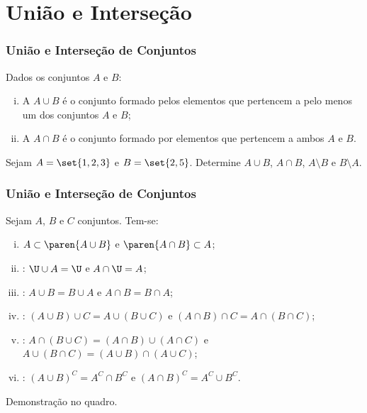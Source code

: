 \section{União e Interseção}


\begin{frame}
\frametitle{União e Interseção de Conjuntos} %

\begin{Def}
Dados os conjuntos $A$ e $B$:
\begin{enumerate}[i.]
	\item A  $A \cup B$ é o conjunto formado pelos
	elementos que pertencem a pelo menos um dos conjuntos $A$ e $B$;
	\item A  $A \cap B$ é o conjunto formado por elementos que pertencem a ambos $A$ e
	$B$.
\end{enumerate}
\end{Def}

\begin{Exem}
Sejam $A = \set{1, 2, 3}$ e $ B = \set{2,5}$. Determine $A \cup B$,
$A \cap B$, $A \setminus B$ e $B \setminus A$.
\end{Exem}

\end{frame}


\begin{frame}
\frametitle{União e Interseção de Conjuntos} %
\begin{Prop} \label{propuniaoint}
Sejam $A$, $B$ e $C$ conjuntos. Tem-se:
\begin{enumerate}[i.]
	\item $A \subset \paren{A \cup B}$ e $\paren{A \cap B} \subset A$;
	\item {}: $\U \cup A = \U$ e $A \cap \U = A$;
	\item {}: $A \cup B = B \cup A$ e $A \cap B = B \cap A$;
	\item {}: $\left(A \cup B \right) \cup C = A
	\cup \left( B \cup C \right)$ e $\left(A \cap B \right) \cap C = A
	\cap \left( B \cap C \right)$;

	\item {}: $A \cap
	\left( B \cup C \right) = \left(A \cap B \right) \cup \left( A \cap C
	\right)$ e $A \cup \left( B \cap C \right) = \left(A \cup B \right) \cap
	\left( A \cup C  \right)$;

	\item {}: $\left( A \cup B \right)^C = A^C \cap
	B^C$ e $\left(A \cap B \right)^C = A^C \cup B^C$.

	\end{enumerate}
\end{Prop}

Demonstração no quadro.


\end{frame}